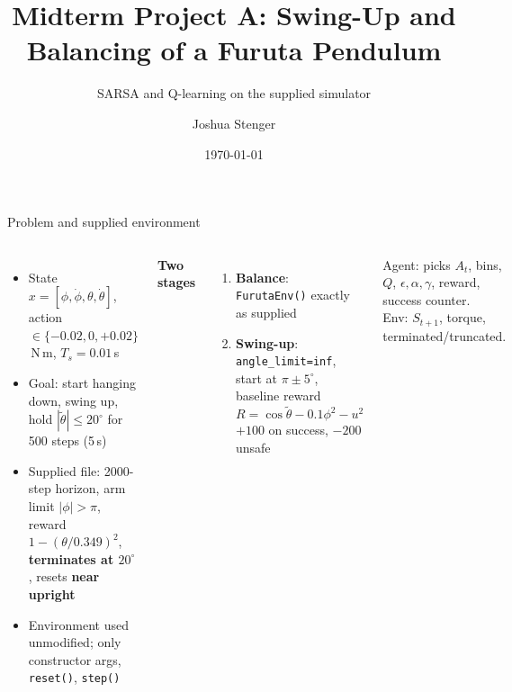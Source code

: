 \documentclass[aspectratio=169,10pt]{beamer}
\title[Furuta Swing-Up with Tabular RL]{Midterm Project A: Swing-Up and Balancing of a Furuta Pendulum}
\subtitle{SARSA and Q-learning on the supplied simulator}
\author{Joshua Stenger}
\institute{COSC 527 Reinforcement Learning}
\date{\today}
\newcommand{\thw}{\tilde\theta}
\begin{document}
\begin{frame}
\titlepage
\end{frame}

\begin{frame}{Problem and supplied environment}
\begin{columns}[T]
\begin{itemize}
\item State $x=[\phi,\dot\phi,\theta,\dot\theta]$, action $\in\{-0.02,0,+0.02\}$\,N\,m, $T_s=0.01$\,s
\item Goal: start hanging down, swing up, hold $|\thw|\le20^\circ$ for 500 steps (5\,s)
\item Supplied file: 2000-step horizon, arm limit $|\phi|>\pi$, reward $1-(\theta/0.349)^2$, \textbf{terminates at $20^\circ$}, resets \textbf{near upright}
\item Environment used unmodified; only constructor args, \texttt{reset()}, \texttt{step()}
\end{itemize}
\textbf{Two stages}
\begin{enumerate}
\item \textbf{Balance}: \texttt{FurutaEnv()} exactly as supplied
\item \textbf{Swing-up}: \texttt{angle\_limit=inf}, start at $\pi\pm5^\circ$, baseline reward
\[R=\cos\thw-0.1\phi^2-u^2\]
$+100$ on success, $-200$ unsafe
\end{enumerate}
Agent: picks $A_t$, bins, $Q$, $\epsilon,\alpha,\gamma$, reward, success counter.\\
Env: $S_{t+1}$, torque, terminated/truncated.
\end{columns}
\end{frame}
\end{document}

